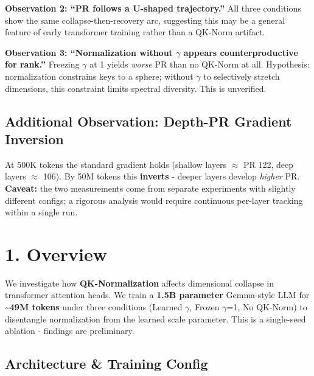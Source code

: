 \documentclass[11pt]{article}
\begin{document}
\begin{tcolorbox}[colback=gray!10, colframe=gray!50, arc=2mm, boxrule=0.5pt]
\textbf{Observation 2: ``PR follows a U-shaped trajectory.''} All three conditions show the same collapse-then-recovery arc, suggesting this may be a general feature of early transformer training rather than a QK-Norm artifact.
\end{tcolorbox}

\begin{tcolorbox}[colback=gray!10, colframe=gray!50, arc=2mm, boxrule=0.5pt]
\textbf{Observation 3: ``Normalization without $\gamma$ appears counterproductive for rank.''} Freezing $\gamma$ at 1 yields \textit{worse} PR than no QK-Norm at all. Hypothesis: normalization constrains keys to a sphere; without $\gamma$ to selectively stretch dimensions, this constraint limits spectral diversity. This is unverified.
\end{tcolorbox}

\subsection{Additional Observation: Depth-PR Gradient Inversion}

\begin{tcolorbox}[colback=gray!10, colframe=gray!50, arc=2mm, boxrule=0.5pt]
At 500K tokens the standard gradient holds (shallow layers $\approx$ PR 122, deep layers $\approx$ 106). By 50M tokens this \textbf{inverts} - deeper layers develop \textit{higher} PR. \textbf{Caveat:} the two measurements come from separate experiments with slightly different configs; a rigorous analysis would require continuous per-layer tracking within a single run.
\end{tcolorbox}

\section{1. Overview}

We investigate how \textbf{QK-Normalization} affects dimensional collapse in transformer attention heads. We train a \textbf{1.5B parameter} Gemma-style LLM for \textbf{\textasciitilde49M tokens} under three conditions (Learned $\gamma$, Frozen $\gamma$=1, No QK-Norm) to disentangle normalization from the learned scale parameter. This is a single-seed ablation - findings are preliminary.

\subsection{Architecture \& Training Config}
\end{document}
